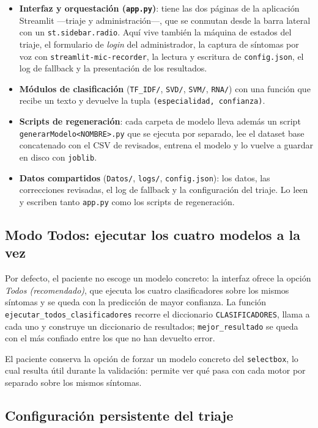 \begin{itemize}
	\item \textbf{Interfaz y orquestación (\texttt{app.py})}: tiene las dos páginas de la aplicación Streamlit ---triaje y administración---, que se conmutan desde la barra lateral con un \texttt{st.sidebar.radio}. Aquí vive también la máquina de estados del triaje, el formulario de \textit{login} del administrador, la captura de síntomas por voz con \texttt{streamlit-mic-recorder}, la lectura y escritura de \texttt{config.json}, el log de fallback y la presentación de los resultados.
	\item \textbf{Módulos de clasificación} (\texttt{TF\_IDF/}, \texttt{SVD/}, \texttt{SVM/}, \texttt{RNA/}) con una función que recibe un texto y devuelve la tupla \texttt{(especialidad, confianza)}. 
	\item \textbf{Scripts de regeneración}: cada carpeta de modelo lleva además un script \texttt{generarModelo<NOMBRE>.py} que se ejecuta por separado, lee el dataset base concatenado con el CSV de revisados, entrena el modelo y lo vuelve a guardar en disco con \texttt{joblib}.
	\item \textbf{Datos compartidos} (\texttt{Datos/}, \texttt{logs/}, \texttt{config.json}): los datos, las correcciones revisadas, el log de fallback y la configuración del triaje. Lo leen y escriben tanto \texttt{app.py} como los scripts de regeneración.
\end{itemize}


\subsection*{Modo Todos: ejecutar los cuatro modelos a la vez}

Por defecto, el paciente no escoge un modelo concreto: la interfaz ofrece la opción \textit{Todos (recomendado)}, que ejecuta los cuatro clasificadores sobre los mismos síntomas y se queda con la predicción de mayor confianza. La función \texttt{ejecutar\_todos\_clasificadores} recorre el diccionario \texttt{CLASIFICADORES}, llama a cada uno y construye un diccionario de resultados; \texttt{mejor\_resultado} se queda con el más confiado entre los que no han devuelto error.

El paciente conserva la opción de forzar un modelo concreto del \texttt{selectbox}, lo cual resulta útil durante la validación: permite ver qué pasa con cada motor por separado sobre los mismos síntomas.

\subsection*{Configuración persistente del triaje}

